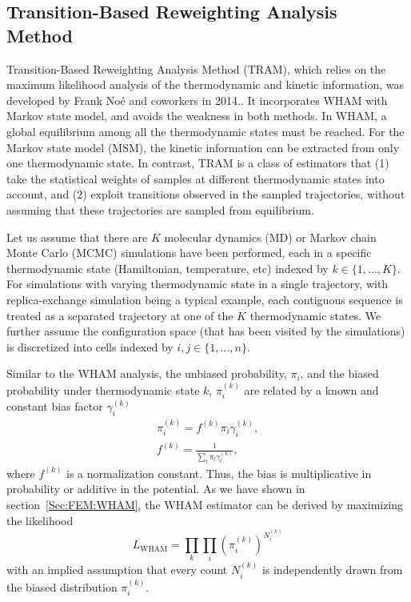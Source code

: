 \subsection{Transition-Based Reweighting Analysis Method\label{Sec:FEM:TRAM}}
Transition-Based Reweighting Analysis Method (TRAM), which relies on the maximum likelihood analysis of the thermodynamic and kinetic information, was developed by Frank No\'{e} and coworkers in 2014.\cite{WuJCP2014}. It incorporates WHAM with Markov state model, and avoids the weakness in both methods. In WHAM, a global equilibrium among all the thermodynamic states must be reached. For the Markov state model (MSM), the kinetic information can be extracted from only one thermodynamic state. In contrast, TRAM is a class of estimators that (1) take the statistical weights of samples at different thermodynamic states into account, and (2) exploit transitions observed in the sampled trajectories, without assuming that these trajectories are sampled from equilibrium.

Let us assume that there are $K$ molecular dynamics (MD) or Markov chain Monte Carlo (MCMC) simulations have been performed, each in a specific thermodynamic state (Hamiltonian, temperature, etc) indexed by $k\in \{1,\dots,K\}$. For simulations with varying thermodynamic state in a single trajectory, with replica-exchange simulation being a typical example, each contiguous sequence is treated as a separated trajectory at one of the $K$ thermodynamic states. We further assume the configuration space (that has been visited by the simulations) is discretized into cells indexed by $i,j\in \{1,\dots,n\}$. 

Similar to the WHAM analysis, the unbiased probability, $\pi_i$, and the biased probability under thermodynamic state $k$, $\pi_i^{(k)}$ are related by a known and constant bias factor $\gamma_i^{(k)}$
\begin{align}
    \pi_i^{(k)}=f^{(k)}\pi_i\gamma_i^{(k)},\label{Eq:FEM:TRAM:reweight}\\
    f^{(k)}=\frac{1}{\sum_l \pi_l\gamma_l^{(k)}}\label{Eq:FEM:TRAM:f},
\end{align}
where $f^{(k)}$ is a normalization constant. Thus, the bias is multiplicative in probability or additive in the potential. As we have shown in section~\ref{Sec:FEM:WHAM}, the WHAM estimator can be derived by maximizing the likelihood
\begin{equation}
    L_{\mathrm{WHAM}}=\prod\limits_k\prod\limits_i (\pi_i^{(k)})^{N_i^{(k)}}
\end{equation}
with an implied assumption that every count $N_i^{(k)}$ is independently drawn from the biased distribution $\pi_i^{(k)}$.

